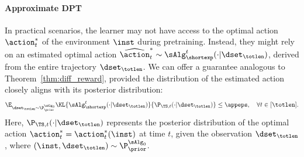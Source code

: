 \documentclass[10pt]{article}
\newcommand{\authnote}[2]{{\scriptsize $\ll$\textsf{#1 notes: #2}$\gg$}}
\newcommand{\authnote}[2]{}
\newcommand{\lc}[1]{{\color{blue}\authnote{Licong}{#1}}}
\begin{document}
\paragraph{Approximate DPT} In practical scenarios, the learner may not have access to the optimal action $\action^*_t$ of the environment $\inst$ during pretraining. Instead, they might rely on an estimated optimal action $\widehat\action_t^* \sim \sAlg_{\shortexp}^t(\cdot | \dset_\totlen)$, derived from the entire trajectory $\dset_\totlen$. We can offer a guarantee analogous to Theorem~\ref{thm:diff_reward}, provided the distribution of the estimated action closely aligns with its posterior distribution: 
\begin{align}\E_{\dset_\totlen\sim\P_{\prior}^{\sAlg_0}}\KL{\sAlg_{\shortexp}^t(\cdot | \dset_\totlen)}{\P_{\TS,t}(\cdot|\dset_\totlen)}\leq\appeps,~~~ \forall t \in [\totlen]. 
\label{eq:app_opt_cond}
\end{align}
Here, $\P_{\TS,t}(\cdot|\dset_\totlen)$ represents the posterior distribution of the optimal action $\action^*_t=\action^*_t(\inst)$ at time $t$, given the observation $\dset_\totlen$, where $(\inst, \dset_\totlen) \sim \P_\prior^{\sAlg_0}$. 

\end{document}
